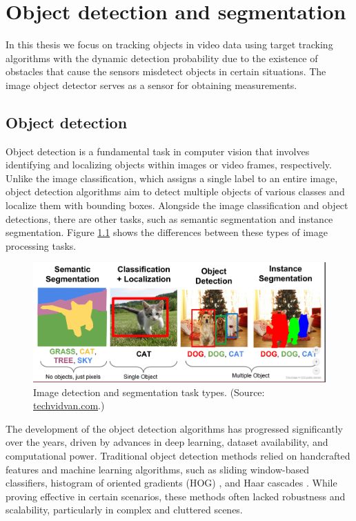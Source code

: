 \chapter{Object detection and segmentation}
In this thesis we focus on tracking objects in video data using target tracking algorithms with the dynamic detection probability due to the existence of obstacles that cause the sensors misdetect objects in certain situations. The image object detector serves as a sensor for obtaining measurements.


\section{Object detection}
Object detection is a fundamental task in computer vision that involves identifying and localizing objects
within images or video frames, respectively. Unlike the image classification, which assigns a single label to an entire
image, object
detection algorithms aim to detect multiple objects of various classes and localize them with bounding boxes.
Alongside the image classification and object detections, there are other tasks, such as semantic segmentation and
instance segmentation. Figure \ref{fig:seg_type} shows the differences between these types of image processing tasks.

\begin{figure}
  \centering
  \includegraphics[width=\linewidth]{text/chapter_03/imgs/segmentation-types}
  \caption{Image detection and segmentation task types. (Source: \href{https://techvidvan.com/tutorials/image-segmentation-machine-learning/}{techvidvan.com}.)}
  \label{fig:seg_type}
\end{figure}

The development of the object detection algorithms has progressed significantly over the years, driven by advances in deep
learning, dataset availability, and computational power. Traditional object detection methods relied on handcrafted
features and machine learning algorithms, such as sliding window-based classifiers, histogram of oriented gradients (HOG) \cite{HoOGDalal2005}, and Haar cascades \cite{HaarCascadesLi2016}. While proving effective in certain scenarios, these methods often lacked robustness and scalability, particularly in complex and cluttered scenes.

